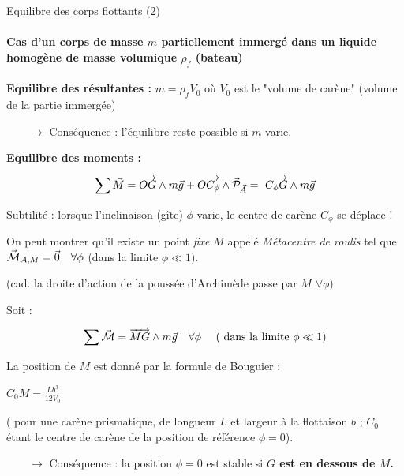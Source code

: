 \begin{frame}{Equilibre des corps flottants (2)}

\small

\paragraph{\bf Cas d'un corps de masse $m$ partiellement immergé dans un liquide homogène de masse volumique 
$\rho_f$ (bateau) } 



\bigskip \pause 

{\bf Equilibre des résultantes :} $ m = \rho_f V_0$ où $V_0$ est le "volume de carène" (volume de la partie immergée)

$ \qquad \rightarrow$ Conséquence : l'équilibre reste possible si $m$ varie. 

\bigskip \pause

{\bf Equilibre des moments :} 

$$
\sum \vec{M} =  \overrightarrow{OG} \wedge m \vec{g} + \overrightarrow{OC_\phi} \wedge \vec{\cal P}_{\vec A} =  \ \overrightarrow{C_\phi G} \wedge m \vec{g} 
$$

\smallskip 
\pause

Subtilité : lorsque l'inclinaison (gîte) $\phi$ varie, le centre de carène $C_\phi$ se déplace ! 

\smallskip 
\pause

On peut montrer qu'il existe un point {\em fixe} $M$ appelé {\em Métacentre de roulis} tel que 
$\vec{\cal M}_{{\cal A},M} = \vec 0 \quad \forall  \phi$ (dans la limite $\phi \ll 1$).

\smallskip 
(cad. la droite d'action de la poussée d'Archimède passe par $M$  $\forall  \phi$) 

\smallskip
Soit :

$$\sum \vec{\cal M} =   \overrightarrow{MG} \wedge m \vec{g} \quad \forall \phi \quad \mbox{ ( dans la limite } \phi \ll 1 ) $$

\smallskip 
\pause

La position de $M$ est donné par la formule de Bouguier : 

$C_0 M = \frac{ L b^3 }{12 V_0}$ 

( pour une carène prismatique, de longueur $L$ et largeur à la flottaison $b$ ; $C_0$ étant le centre de carène de la position de référence $\phi = 0$).

\medskip \pause

$ \qquad \rightarrow$ Conséquence : la position $\phi = 0$ est stable si {\bf $G$ est en dessous de $M$.}



\end{frame}




